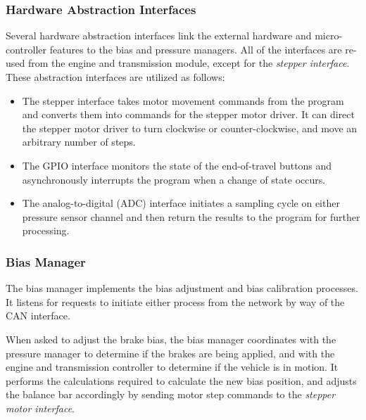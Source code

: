 
\subsubsection{Hardware Abstraction Interfaces}

Several hardware abstraction interfaces link the external hardware and micro-controller features to the bias and pressure managers. All of the interfaces are re-used from the engine and transmission module, except for the \emph{stepper interface}. These abstraction interfaces are utilized as follows:

\begin{itemize}

\item The stepper interface takes motor movement commands from the program and converts them into commands for the stepper motor driver. It can direct the stepper motor driver to turn clockwise or counter-clockwise, and move an arbitrary number of steps. 

\item The GPIO interface monitors the state of the end-of-travel buttons and asynchronously interrupts the program when a change of state occurs. 

\item The analog-to-digital (ADC) interface initiates a sampling cycle on either pressure sensor channel and then return the results to the program for further processing. 

\end{itemize}

\subsubsection{Bias Manager}

The bias manager implements the bias adjustment and bias calibration processes. It listens for requests to initiate either process from the network by way of the CAN interface.

When asked to adjust the brake bias, the bias manager coordinates with the pressure manager to determine if the brakes are being applied, and with the engine and transmission controller to determine if the vehicle is in motion. It performs the calculations required to calculate the new bias position, and adjusts the balance bar accordingly by sending motor step commands to the \emph{stepper motor interface}.

